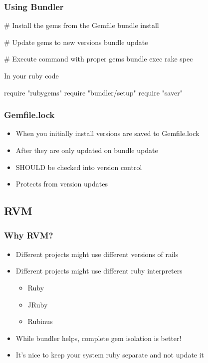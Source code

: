\begin{frame}[fragile]
  \frametitle{Using Bundler}
  \begin{console}
    # Install the gems from the Gemfile
    bundle install

    # Update gems to new versions
    bundle update

    # Execute command with proper gems
    bundle exec rake spec
  \end{console}
  In your ruby code
  \begin{rubycode}
    require "rubygems"
    require "bundler/setup"
    require "saver"
  \end{rubycode}
\end{frame}

\begin{frame}[fragile]
  \frametitle{Gemfile.lock}
  \begin{itemize}
  \item When you initially install versions are saved to Gemfile.lock
  \pause
  \item After they are only updated on bundle update
  \pause
  \item SHOULD be checked into version control
  \item Protects from version updates
  \end{itemize}
\end{frame}

\subsection{RVM}

\begin{frame}[fragile]
  \frametitle{Why RVM?}
  \begin{itemize}
  \item Different projects might use different versions of rails
  \pause
  \item Different projects might use different ruby interpreters
    \begin{itemize}
    \item Ruby
    \item JRuby
    \item Rubinus
    \end{itemize}
  \pause
  \item While bundler helps, complete gem isolation is better!
  \pause
  \item It's nice to keep your system ruby separate and not update it
  \end{itemize}
\end{frame}

